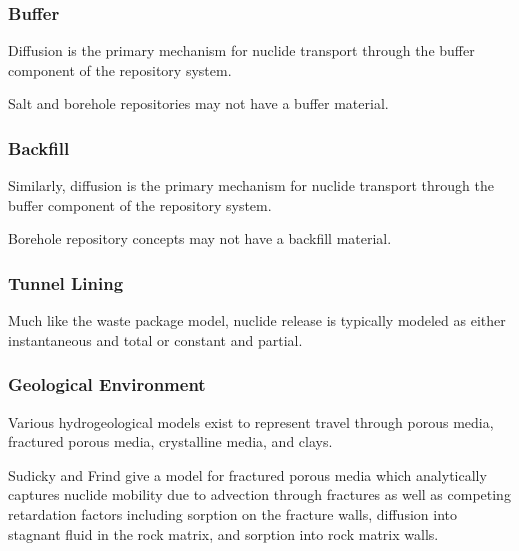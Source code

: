 \subsubsection{Buffer}
Diffusion is the primary mechanism for nuclide transport through the 
buffer component of the repository system.  

Salt and borehole repositories may not have a buffer material.

\subsubsection{Backfill}
Similarly, diffusion is the primary mechanism for nuclide transport 
through the buffer component of the repository system.

Borehole repository concepts may not have a backfill material. 

\subsubsection{Tunnel Lining}
Much like the waste package model, nuclide release is typically 
modeled as either instantaneous and total or constant and partial. 

\subsubsection{Geological Environment}
Various hydrogeological models exist to represent travel through 
porous media, fractured porous media, crystalline media, and clays.

Sudicky and Frind give a model for fractured porous media which 
analytically captures nuclide mobility due to advection through 
fractures as well as competing retardation factors including sorption on the 
fracture walls, diffusion into stagnant fluid in the rock matrix, and 
sorption into rock matrix walls. 

